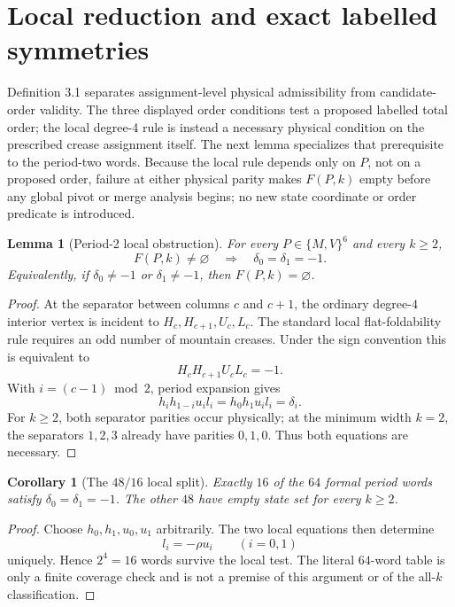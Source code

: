 \documentclass[11pt]{article}
\newtheorem{lemma}[theorem]{Lemma}
\newtheorem{corollary}[theorem]{Corollary}
\theoremstyle{definition}
\theoremstyle{remark}
\begin{document}
\section{Local reduction and exact labelled
symmetries}\label{local-reduction-and-exact-labelled-symmetries}

Definition 3.1 separates assignment-level physical admissibility from candidate-order validity. The three displayed order conditions test a proposed labelled total order; the local degree-4 rule is instead a necessary physical condition on the prescribed crease assignment itself. The next lemma specializes that prerequisite to the period-two words. Because the local rule depends only on \(P\), not on a proposed order, failure at either physical parity makes \(F(P,k)\) empty before any global pivot or merge analysis begins; no new state coordinate or order predicate is introduced.

\begin{lemma}[Period-2 local obstruction]\label{obj:L1}
For every \(P\in\{M,V\}^6\) and every \(k\ge2\), \[
F(P,k)\ne\varnothing
\quad\Longrightarrow\quad
\delta_0=\delta_1=-1.
\] Equivalently, if \(\delta_0\ne-1\) or \(\delta_1\ne-1\), then
\(F(P,k)=\varnothing\).
\end{lemma}
\begin{proof}
 At the separator between columns \(c\) and \(c+1\), the
ordinary degree-\(4\) interior vertex is incident to
\(H_c,H_{c+1},U_c,L_c\). The standard local flat-foldability rule
\cite{Nishat2013,NishatWhitesides2013} requires an odd number
of mountain creases. Under the sign convention this is equivalent to \[
H_cH_{c+1}U_cL_c=-1.
\] With \(i=(c-1)\bmod2\), period expansion gives \[
h_i h_{1-i}u_i l_i=h_0h_1u_i l_i=\delta_i.
\] For \(k\ge2\), both separator parities occur physically; at the
minimum width \(k=2\), the separators \(1,2,3\) already have parities
\(0,1,0\). Thus both equations are necessary.
\end{proof}


\begin{corollary}[The $48/16$ local split]\label{obj:C1}
Exactly \(16\) of the \(64\) formal period words satisfy
\(\delta_0=\delta_1=-1\). The other \(48\) have empty state set for
every \(k\ge2\).
\end{corollary}
\begin{proof}
 Choose \(h_0,h_1,u_0,u_1\) arbitrarily. The two local
equations then determine \[
l_i=-\rho u_i\qquad(i=0,1)
\] uniquely. Hence \(2^4=16\) words survive the local test. The literal
\(64\)-word table is only a finite coverage check and is not a premise
of this argument or of the all-\(k\) classification.
\end{proof}
\end{document}
